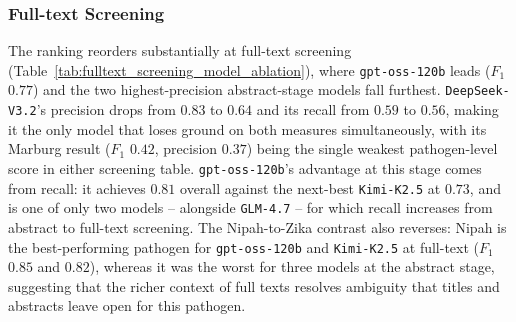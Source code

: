 \subsubsection*{Full-text Screening}

The ranking reorders substantially at full-text screening (Table~\ref{tab:fulltext_screening_model_ablation}), where \texttt{gpt-oss-120b} leads ($F_1$ $0.77$) and the two highest-precision abstract-stage models fall furthest. \texttt{DeepSeek-V3.2}'s precision drops from $0.83$ to $0.64$ and its recall from $0.59$ to $0.56$, making it the only model that loses ground on both measures simultaneously, with its Marburg result ($F_1$ $0.42$, precision $0.37$) being the single weakest pathogen-level score in either screening table. \texttt{gpt-oss-120b}'s advantage at this stage comes from recall: it achieves $0.81$ overall against the next-best \texttt{Kimi-K2.5} at $0.73$, and is one of only two models -- alongside \texttt{GLM-4.7} -- for which recall increases from abstract to full-text screening. The Nipah-to-Zika contrast also reverses: Nipah is the best-performing pathogen for \texttt{gpt-oss-120b} and \texttt{Kimi-K2.5} at full-text ($F_1$ $0.85$ and $0.82$), whereas it was the worst for three models at the abstract stage, suggesting that the richer context of full texts resolves ambiguity that titles and abstracts leave open for this pathogen.




